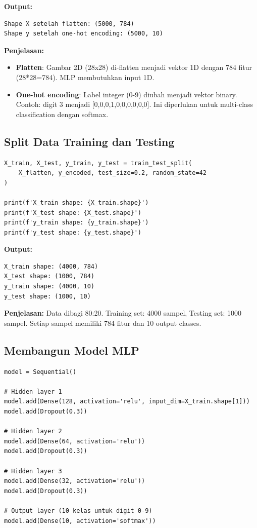 \documentclass[12pt,a4paper]{article}
\begin{document}
\textbf{Output:}
\begin{verbatim}
Shape X setelah flatten: (5000, 784)
Shape y setelah one-hot encoding: (5000, 10)
\end{verbatim}

\textbf{Penjelasan:} 
\begin{itemize}
    \item \textbf{Flatten}: Gambar 2D (28x28) di-flatten menjadi vektor 1D dengan 784 fitur (28*28=784). MLP membutuhkan input 1D.
    \item \textbf{One-hot encoding}: Label integer (0-9) diubah menjadi vektor binary. Contoh: digit 3 menjadi [0,0,0,1,0,0,0,0,0,0]. Ini diperlukan untuk multi-class classification dengan softmax.
\end{itemize}

\subsection{Split Data Training dan Testing}

\begin{lstlisting}[caption=Train-Test Split]
X_train, X_test, y_train, y_test = train_test_split(
    X_flatten, y_encoded, test_size=0.2, random_state=42
)

print(f'X_train shape: {X_train.shape}')
print(f'X_test shape: {X_test.shape}')
print(f'y_train shape: {y_train.shape}')
print(f'y_test shape: {y_test.shape}')
\end{lstlisting}

\textbf{Output:}
\begin{verbatim}
X_train shape: (4000, 784)
X_test shape: (1000, 784)
y_train shape: (4000, 10)
y_test shape: (1000, 10)
\end{verbatim}

\textbf{Penjelasan:} Data dibagi 80:20. Training set: 4000 sampel, Testing set: 1000 sampel. Setiap sampel memiliki 784 fitur dan 10 output classes.

\subsection{Membangun Model MLP}

\begin{lstlisting}[caption=Arsitektur Model MLP]
model = Sequential()

# Hidden layer 1
model.add(Dense(128, activation='relu', input_dim=X_train.shape[1]))
model.add(Dropout(0.3))

# Hidden layer 2
model.add(Dense(64, activation='relu'))
model.add(Dropout(0.3))

# Hidden layer 3
model.add(Dense(32, activation='relu'))
model.add(Dropout(0.3))

# Output layer (10 kelas untuk digit 0-9)
model.add(Dense(10, activation='softmax'))
\end{lstlisting}
\end{document}
